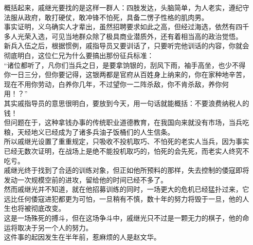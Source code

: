 \begin{multicols}{\theparacolNo}
概括起来，戚继光要找的是这样一群人：四肢发达，头脑简单，为人老实，遵纪守法服从政府，敢打硬仗，敢冲锋不怕死，具备二愣子性格的肌肉男。\\

事实证明，义乌确实人才辈出，虽然招聘要求如此之高，但经过海选，依然有四千多人光荣入选，可见当地群众除了极具商业潜质外，还有着相当高的政治觉悟。\\

新兵入伍之后，根据惯例，戚指导员又要训话了，只要听完他训话的内容，你就会彻底明白，这位仁兄为什么要搞出那份征兵标准：\\

“诸位都听了，凡你们当兵之日，是要拿饷银的，刮风下雨，袖手高坐，也少不得你一日三分，但你要记得，这银两都是官府从百姓身上纳来的，你在家种地辛苦，现在不用你劳动，白养你几年，不过望你一二阵杀敌，你不肯杀敌，养你何用！？”\\

其实戚指导员的意思很明白，要放到今天，用一句话就能概括：不要浪费纳税人的钱！\\

但问题在于，这种拿钱办事的传统职业道德教育，在我国向来就没有市场，当兵吃粮，天经地义已经成为了诸多兵油子饭桶们的人生信条。\\

所以戚继光设置了重重规定，只吸收不投机取巧、不怕死的老实人当兵，因为事实已经无数次证明，在战场上是绝不能投机取巧的，怕死的会先死，而老实人终究不吃亏。\\

戚继光终于找到了合适的训练对象，但正如他所预料的那样，失去控制的倭寇即将发动一次规模空前的进攻，留给他的时间已经不多了。\\

然而戚继光并不知道，就在他招募训练的同时，一场更大的危机已经猛扑过来，它远比任何倭寇进犯都更为可怕，一旦稍有不慎，数十年的努力将毁于一旦，他的人生也将被彻底改变。\\

这是一场殊死的搏斗，但在这场争斗中，戚继光只不过是一颗无力的棋子，他的命运将取决于另一个人的努力。\\

这件事的起因发生在半年前，惹麻烦的人是赵文华。\\
\ifnum{}
	\end{multicols}
\fi
\newpage
